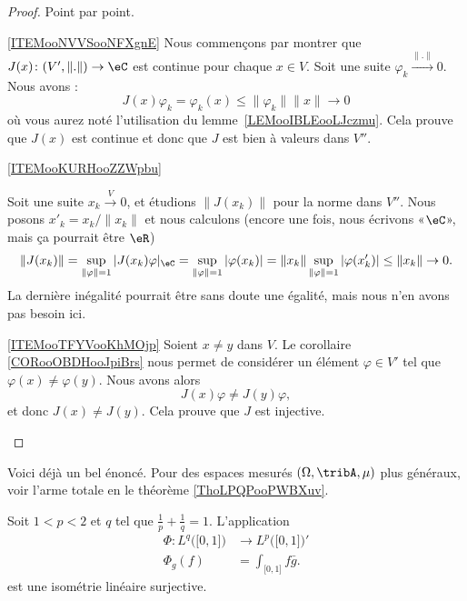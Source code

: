\begin{proof}
    Point par point.
    \begin{subproof}
        \item[\ref{ITEMooNVVSooNFXgnE}]
            Nous commençons par montrer que \( J(x)\colon (V',\| . \|)\to \eC\) est continue pour chaque \( x\in V\). Soit une suite \( \varphi_k\stackrel{\| . \|}{\longrightarrow}0\). Nous avons :
            \begin{equation}
                J(x)\varphi_k=\varphi_k(x)\leq \| \varphi_k \|\| x \|\to 0
            \end{equation}
            où vous aurez noté l'utilisation du lemme~\ref{LEMooIBLEooLJczmu}.  Cela prouve que \( J(x)\) est continue et donc que \( J\) est bien à valeurs dans \( V''\).
        \item[\ref{ITEMooKURHooZZWpbu}]

            Soit une suite \( x_k\stackrel{V}{\longrightarrow}0\), et étudions \( \| J(x_k) \|\) pour la norme dans \( V''\). Nous posons \( x'_k=x_k/\| x_k \|\) et nous calculons (encore une fois, nous écrivons «\( \eC\)», mais ça pourrait être \( \eR\))
            \begin{equation}
                \| J(x_k) \|=\sup_{\| \varphi \|=1}| J(x_k)\varphi |_{\eC}=\sup_{\| \varphi \|=1}| \varphi(x_k) |=\| x_k \|\sup_{\| \varphi \|=1}| \varphi(x'_k) |\leq \| x_k \|\to 0.
            \end{equation}
            La dernière inégalité pourrait être sans doute une égalité, mais nous n'en avons pas besoin ici.
        \item[\ref{ITEMooTFYVooKhMOjp}]
            Soient \( x\neq y\) dans \( V\). Le corollaire \ref{CORooOBDHooJpiBrs} nous permet de considérer un élément \( \varphi\in V'\) tel que \( \varphi(x)\neq \varphi(y)\). Nous avons alors
            \begin{equation}
                J(x)\varphi\neq J(y)\varphi,
            \end{equation}
            et donc \( J(x)\neq J(y)\). Cela prouve que \( J\) est injective.
    \end{subproof}
\end{proof}

Voici déjà un bel énoncé. Pour des espaces mesurés \( (\Omega,\tribA,\mu)\) plus généraux, voir l'arme totale en le théorème \ref{ThoLPQPooPWBXuv}.

\begin{proposition} \label{PropOAVooYZSodR}
    Soit \( 1<p<2\) et \( q\) tel que \( \frac{1}{ p }+\frac{1}{ q }=1\). L'application
    \begin{equation}
        \begin{aligned}
            \Phi\colon L^q\big( \mathopen[ 0 , 1 \mathclose] \big)&\to  L^p\big( \mathopen[ 0 , 1 \mathclose] \big)'  \\
            \Phi_g(f)&= \int_{\mathopen[ 0 , 1 \mathclose]}f\bar g.
        \end{aligned}
    \end{equation}
    est une isométrie linéaire surjective.
\end{proposition}

